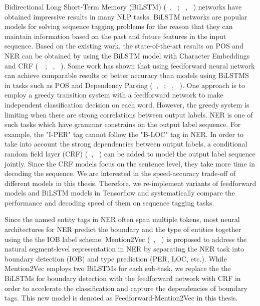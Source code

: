 \documentclass{sfuthesis}
\begin{document}
Bidirectional Long Short-Term Memory (BiLSTM) (~\citeauthor{Hochreiter97longshort-term}, ~\citeyear{Hochreiter97longshort-term}; ~\citeauthor{graves2005framewise}, ~\citeyear{graves2005framewise}) networks have obtained impressive results in many NLP tasks. BiLSTM networks are popular models for solving sequence tagging problems for the reason that they can maintain information based on the past and future features in the input sequence. Based on the existing work, the state-of-the-art results on POS and NER can be obtained by using the BiLSTM model with Character Embeddings and CRF (~\citeauthor{ling2015finding}~\citeyear{ling2015finding}; ~\citeauthor{lample2016neural}, ~\citeyear{lample2016neural}). Some work has shown that using feedforward neural network can achieve comparable results or better accuracy than models using BiLSTMS in tasks such as POS and Dependency Parsing (~\citeauthor{chen2014fast}, ~\citeyear{chen2014fast}; ~\citeauthor{andor2016globally}, ~\citeyear{andor2016globally}). One approach is to employ a greedy transition system with a feedforward network to make independent classification decision on each word. However, the greedy system is limiting when there are strong correlations between output labels. NER is one of such tasks which have grammar constrains on the output label sequence. For example, the "I-PER" tag cannot follow the "B-LOC" tag in NER. In order to take into account the strong dependencies between output labels, a conditional random field layer (CRF) (~\citeauthor{lafferty2001conditional}, ~\~\citeyear{lafferty2001conditional}) can be added to model the output label sequence jointly. Since the CRF models focus on the sentence level, they take more time in decoding the sequence. We are interested in the speed-accuracy trade-off of different models in this thesis. Therefore, we re-implement variants of feedforward models and BiLSTM models in Tensorflow and systematically compare the performance and decoding speed of them on sequence tagging tasks.

Since the named entity tags in NER often span multiple tokens, most neural architectures for NER predict the boundary and the type of entities together using the the IOB label scheme. Mention2Vec (~\citeauthor{stratos2016mention2vec}, ~\citeyear{stratos2016mention2vec}) is proposed to address the natural segment-level representation in NER by separating the NER task into boundary detection (IOB) and type prediction (PER, LOC, etc.). While Mention2Vec employs two BiLSTMs for each sub-task, we replace the the BiLSTMs for boundary detection with the feedforward network with CRF in order to accelerate the classification and capture the dependencies of boundary tags. This new model is denoted as Feedforward-Mention2Vec in this thesis.
\end{document}
